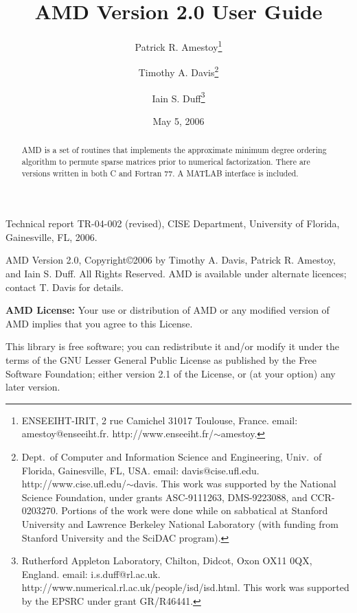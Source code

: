 \documentclass[11pt]{article}
\begin{document}

\title{AMD Version 2.0 User Guide}
\author{Patrick R. Amestoy\thanks{ENSEEIHT-IRIT,
2 rue Camichel 31017 Toulouse, France.
email: amestoy@enseeiht.fr.  http://www.enseeiht.fr/$\sim$amestoy.}
\and Timothy A. Davis\thanks{
Dept.~of Computer and Information Science and Engineering,
Univ.~of Florida, Gainesville, FL, USA.
email: davis@cise.ufl.edu.
http://www.cise.ufl.edu/$\sim$davis.
This work was supported by the National
Science Foundation, under grants ASC-9111263, DMS-9223088, and CCR-0203270.
Portions of the work were done while on sabbatical at Stanford University
and Lawrence Berkeley National Laboratory (with funding from Stanford
University and the SciDAC program).
}
\and Iain S. Duff\thanks{Rutherford Appleton Laboratory, Chilton, Didcot, 
Oxon OX11 0QX, England. email: i.s.duff@rl.ac.uk.  
http://www.numerical.rl.ac.uk/people/isd/isd.html.
This work was supported by the EPSRC under grant GR/R46441.
}}

\date{May 5, 2006}
\maketitle

\begin{abstract}
AMD is a set of routines that implements the approximate minimum degree ordering
algorithm to permute sparse matrices prior to
numerical factorization.
There are versions written in both C and Fortran 77.
A MATLAB interface is included.
\end{abstract}

Technical report TR-04-002 (revised), CISE Department, University of Florida,
Gainesville, FL, 2006.

AMD Version 2.0, Copyright\copyright 2006 by Timothy A.
Davis, Patrick R. Amestoy, and Iain S. Duff.  All Rights Reserved.
AMD is available under alternate licences; contact T. Davis for details.

{\bf AMD License:}
    Your use or distribution of AMD or any modified version of
    AMD implies that you agree to this License.

    This library is free software; you can redistribute it and/or
    modify it under the terms of the GNU Lesser General Public
    License as published by the Free Software Foundation; either
    version 2.1 of the License, or (at your option) any later version.
\end{document}
